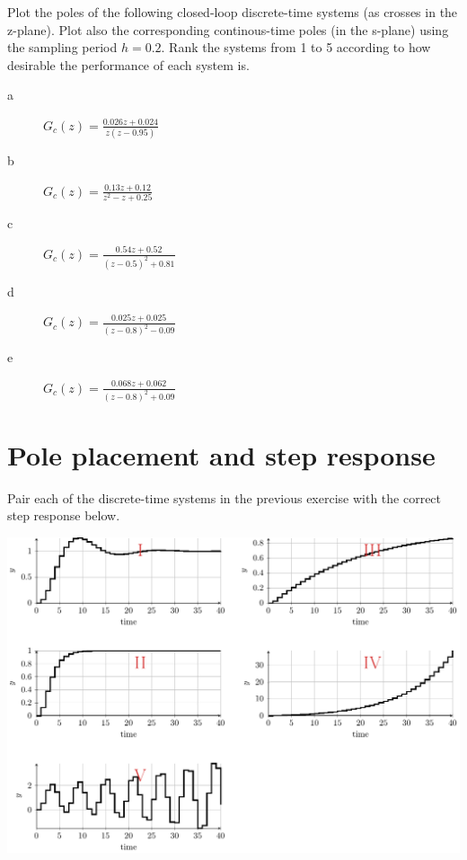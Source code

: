 \documentclass[letterpaper,fleqn]{scrartcl}
\begin{document}
Plot the poles of the following closed-loop discrete-time systems (as crosses in the z-plane). Plot also the corresponding continous-time poles (in the s-plane) using the sampling period \(h=0.2\). Rank the systems from 1 to 5 according to how desirable the performance of each system is.
\begin{description}
\item[{a}] \( G_c(z) = \frac{0.026z + 0.024}{z(z-0.95)}\)
\item[{b}] \( G_c(z) = \frac{0.13z + 0.12}{z^2 - z + 0.25} \)
\item[{c}] \(G_c(z) = \frac{0.54z + 0.52}{(z-0.5)^2 + 0.81}\)
\item[{d}] \(G_c(z) = \frac{0.025z + 0.025}{(z-0.8)^2 - 0.09}\)
\item[{e}] \(G_c(z) = \frac{0.068z + 0.062}{(z-0.8)^2 + 0.09}\)
\end{description}

\newpage 


\section*{Pole placement and step response}
\label{sec-2}
Pair each of the discrete-time systems in the previous exercise with the correct step response below.
\begin{center}
\includegraphics[width=\linewidth]{../../figures/closed-loop-step-responsen}
\end{center}
\end{document}
